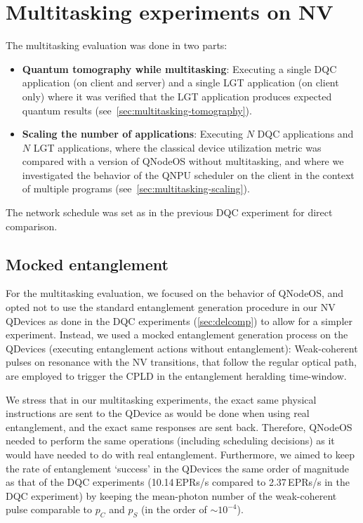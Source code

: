 \section{Multitasking experiments on NV}

The multitasking evaluation was done in two parts:
%
\begin{itemize}
    \item \textbf{Quantum tomography while multitasking}: Executing a single \ac{DQC} application (on client and server) and a single \ac{LGT} application (on client only) where it was verified that the \ac{LGT} application produces expected quantum results (see~\cref{sec:multitasking-tomography}).
    \item \textbf{Scaling the number of applications}: Executing $N$ \ac{DQC} applications and $N$ \ac{LGT} applications, where the classical device utilization metric was compared with a version of \ac{QNodeOS} without multitasking, and where we investigated the behavior of the \ac{QNPU} scheduler on the client in the context of multiple programs (see~\cref{sec:multitasking-scaling}).
\end{itemize}
%
The network schedule was set as in the previous \ac{DQC} experiment for direct comparison.

\subsection{Mocked entanglement}
\label{sec:mocked_entanglement}

For the multitasking evaluation, we focused on the behavior of \ac{QNodeOS}, and opted not to use the standard entanglement generation procedure in our \ac{NV} \acp{QDevice} as done in the \ac{DQC} experiments (\cref{sec:delcomp}) to allow for a simpler experiment. Instead, we used a mocked entanglement generation process on the \acp{QDevice} (executing entanglement actions without entanglement): Weak-coherent pulses on resonance with the \ac{NV} transitions, that follow the regular optical path, are employed to trigger the \ac{CPLD} in the entanglement heralding time-window.

We stress that in our multitasking experiments, the exact same physical instructions are sent to the \ac{QDevice} as would be done when using real entanglement, and the exact same responses are sent back. Therefore, \ac{QNodeOS} needed to perform the same operations (including scheduling decisions) as it would have needed to do with real entanglement. Furthermore, we aimed to keep the rate of entanglement `success' in the \acp{QDevice} the same order of magnitude as that of the \ac{DQC} experiments (10.14\,\acp{EPR}/s compared to 2.37\,\acp{EPR}/s in the \ac{DQC} experiment) by keeping the mean-photon number of the weak-coherent pulse comparable to $p_C$ and $p_S$ (in the order of $\sim10^{-4}$). 

